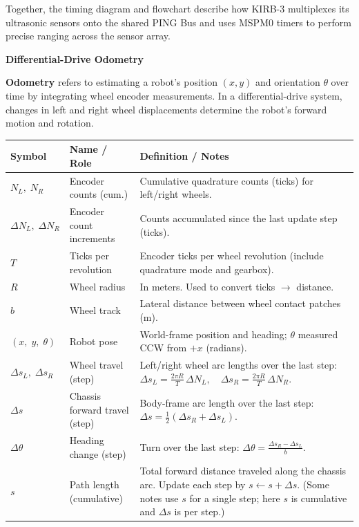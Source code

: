 \documentclass[12pt]{article}
\begin{document}
Together, the timing diagram and flowchart describe how KIRB-3 multiplexes its
ultrasonic sensors onto the shared PING Bus and uses MSPM0 timers to perform
precise ranging across the sensor array.
\newpage
\begin{center}
    {\LARGE \textbf{Differential-Drive Odometry}}\\[0.5em]
\end{center}
\noindent
\textbf{Odometry} refers to estimating a robot’s position $(x, y)$ and orientation $\theta$ over time by integrating wheel encoder measurements. 
In a differential-drive system, changes in left and right wheel displacements determine the robot’s forward motion and rotation.

\begin{table}[h]
\centering
\scriptsize
\renewcommand{\arraystretch}{1.15}
\begin{tabular}{@{}llp{8.5cm}@{}}
\toprule
\textbf{Symbol} & \textbf{Name / Role} & \textbf{Definition / Notes} \\
\midrule
$N_L,\;N_R$ & Encoder counts (cum.) & Cumulative quadrature counts (ticks) for left/right wheels. \\
$\Delta N_L,\;\Delta N_R$ & Encoder count increments & Counts accumulated since the last update step (ticks). \\
$T$ & Ticks per revolution & Encoder ticks per wheel revolution (include quadrature mode and gearbox). \\
$R$ & Wheel radius & In meters. Used to convert ticks $\to$ distance. \\
$b$ & Wheel track & Lateral distance between wheel contact patches (m). \\
$(x,\;y,\;\theta)$ & Robot pose & World-frame position and heading; $\theta$ measured CCW from $+x$ (radians). \\
\midrule
$\Delta s_L,\;\Delta s_R$ & Wheel travel (step) & Left/right wheel arc lengths over the last step:
$\displaystyle \Delta s_L=\frac{2\pi R}{T}\,\Delta N_L,\quad
\Delta s_R=\frac{2\pi R}{T}\,\Delta N_R.$ \\
$\Delta s$ & Chassis forward travel (step) & Body-frame arc length over the last step:
$\displaystyle \Delta s=\tfrac{1}{2}(\Delta s_R+\Delta s_L).$ \\
$\Delta \theta$ & Heading change (step) & Turn over the last step:
$\displaystyle \Delta \theta=\frac{\Delta s_R-\Delta s_L}{b}.$ \\
$s$ & Path length (cumulative) & Total forward distance traveled along the chassis arc. Update each step by
$\displaystyle s \leftarrow s+\Delta s.$ (Some notes use $s$ for a single step; here $s$ is cumulative and $\Delta s$ is per step.) \\
\bottomrule
\end{tabular}
\end{table}
\end{document}
